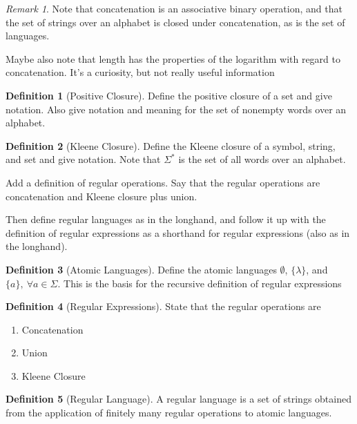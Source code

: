 \documentclass[12 pt, twoside, letterpaper]{article}
\newcommand{\note}[1]{\textit{\color{blue}{#1}}}
\newcommand{\meo}[1]{#1}
\theoremstyle{definition}
\newtheorem{definition}{Definition}
\theoremstyle{remark}
\newtheorem*{remark}{Remark}
\theoremstyle{plain}
\begin{document}
		\begin{remark}
			Note that concatenation is an associative binary operation, and that the set of strings over an alphabet is closed under concatenation, as is the set of languages.
			\meo{
				Maybe also note that length has the properties of the logarithm with regard to concatenation.
				It's a curiosity, but not really useful information
			}
		\end{remark}

		\begin{definition}[Positive Closure]
			Define the positive closure of a set and give notation. 
			Also give notation and meaning for the set of nonempty words over an alphabet.
			\note{I'm not sure I actually need to include this.}
		\end{definition}

		\begin{definition}[Kleene Closure]
			Define the Kleene closure of a symbol, string, and set and give notation.
			Note that $\Sigma^*$ is the set of all words over an alphabet.
		\end{definition}

		\meo{
			Add a definition of regular operations. 
			Say that the regular operations are concatenation and Kleene closure plus union.

			Then define regular languages as in the longhand, and follow it up with the definition of regular expressions as a shorthand for regular expressions (also as in the longhand).
		}

		\begin{definition}[Atomic Languages]
			Define the atomic languages $\emptyset$, $\{ \lambda \}$, and $\{ a \}, \ \forall a \in \Sigma$.
			This is the basis for the recursive definition of regular expressions
		\end{definition}

		\begin{definition}[Regular Expressions]
			State that the regular operations are 
			\begin{enumerate}[label=(\roman*), itemsep = -0.3 ex]
				\item Concatenation
				\item Union
				\item Kleene Closure
			\end{enumerate}
		\end{definition}

		\begin{definition}[Regular Language]
			A regular language is a set of strings obtained from the application of finitely many regular operations to atomic languages.
		\end{definition}
\end{document}
